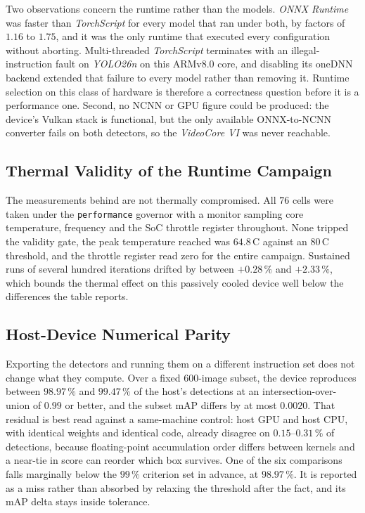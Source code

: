 Two observations concern the runtime rather than the models. \textit{ONNX Runtime} was faster than \textit{TorchScript} for every model that ran under both, by factors of $1.16$ to $1.75$, and it was the only runtime that executed every configuration without aborting. Multi-threaded \textit{TorchScript} terminates with an illegal-instruction fault on \textit{YOLO26n} on this ARMv8.0 core, and disabling its oneDNN backend extended that failure to every model rather than removing it.
Runtime selection on this class of hardware is therefore a correctness question before it is a performance one. Second, no NCNN or GPU figure could be produced: the device's Vulkan stack is functional, but the only available ONNX-to-NCNN converter fails on both detectors, so the \textit{VideoCore VI} was never reachable.

\subsection{Thermal Validity of the Runtime Campaign}\label{sec:appendix_thermal_validity}

The measurements behind  are not thermally compromised. All $76$ cells were taken under the \texttt{performance} governor with a monitor sampling core temperature, frequency and the SoC throttle register throughout. None tripped the validity gate, the peak temperature reached was $64.8$\,\textdegree C against an $80$\,\textdegree C threshold, and the throttle register read zero for the entire campaign. Sustained runs of several hundred iterations drifted by between $+0.28\,\%$ and $+2.33\,\%$, which bounds the thermal effect on this passively cooled device well below the differences the table reports.

\subsection{Host-Device Numerical Parity}\label{sec:appendix_host_device_parity}

Exporting the detectors and running them on a different instruction set does not change what they compute. Over a fixed $600$-image subset, the device reproduces between $98.97\,\%$ and $99.47\,\%$ of the host's detections at an intersection-over-union of $0.99$ or better, and the subset mAP differs by at most $0.0020$.
That residual is best read against a same-machine control: host GPU and host CPU, with identical weights and identical code, already disagree on $0.15$--$0.31\,\%$ of detections, because floating-point accumulation order differs between kernels and a near-tie in score can reorder which box survives. One of the six comparisons falls marginally below the $99\,\%$ criterion set in advance, at $98.97\,\%$. It is reported as a miss rather than absorbed by relaxing the threshold after the fact, and its mAP delta stays inside tolerance.

